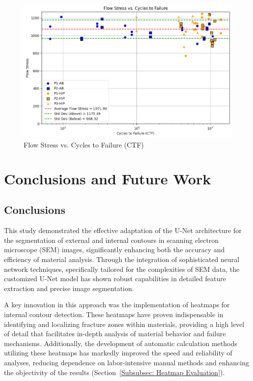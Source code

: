 \documentclass{ieeeaccess}
\begin{document}
\begin{figure}[!t]
    \begin{minipage}{0.45\linewidth}
        \centering
        \includegraphics[width=\linewidth]{figures/Flow Stress vs Cycles to Failure.png}
        \caption{Flow Stress vs. Cycles to Failure (CTF)}
        \label{fig:flow_stress}
    \end{minipage}
    \label{fig:combined_graphs}
\end{figure}

\section{Conclusions and Future Work}
\label{Sec: Conclusions and future work}

\subsection{Conclusions}
This study demonstrated the effective adaptation of the U-Net architecture for the segmentation of external and internal contours in scanning electron microscope (SEM) images, significantly enhancing both the accuracy and efficiency of material analysis. Through the integration of sophisticated neural network techniques, specifically tailored for the complexities of SEM data, the customized U-Net model has shown robust capabilities in detailed feature extraction and precise image segmentation.

A key innovation in this approach was the implementation of heatmaps for internal contour detection. These heatmaps have proven indispensable in identifying and localizing fracture zones within materials, providing a high level of detail that facilitates in-depth analysis of material behavior and failure mechanisms. Additionally, the development of automatic calculation methods utilizing these heatmaps has markedly improved the speed and reliability of analyses, reducing dependence on labor-intensive manual methods and enhancing the objectivity of the results (Section~\ref{Subsubsec: Heatmap Evaluation}).
\end{document}
